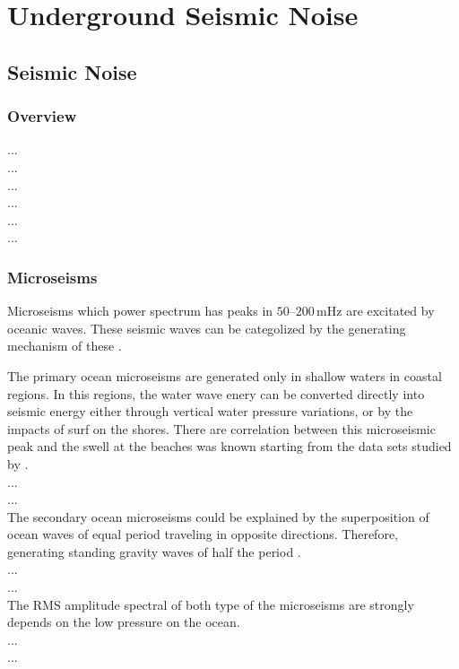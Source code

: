 \chapter{Underground Seismic Noise}

\section{Seismic Noise}
\subsection{Overview}
...\\
...\\
...\\
...\\
...\\
...\\

\subsection{Microseisms}
Microseisms which power spectrum has peaks in $50$--$200\,\mathrm{mHz}$ are excitated by oceanic waves. These seismic waves can be categolized by the generating mechanism of these \cite{Bormann2012new}.

The primary ocean microseisms are generated only in shallow waters in coastal regions. In this regions, the water wave enery can be converted directly into seismic energy either through vertical water pressure variations, or by the impacts of surf on the shores. There are correlation between this microseismic peak and the swell at the beaches was known starting from the data sets studied by \cite{haubrich1963comparative}.
\\
...\\
...\\

The secondary ocean microseisms could be explained by the superposition of ocean waves of equal period traveling in opposite directions. Therefore, generating standing gravity waves of half the period \cite{longuet1950theory}. 
\\
...\\
...\\

The RMS amplitude spectral of both type of the microseisms are strongly depends on the low pressure on the ocean.
\\
...\\
...\\

